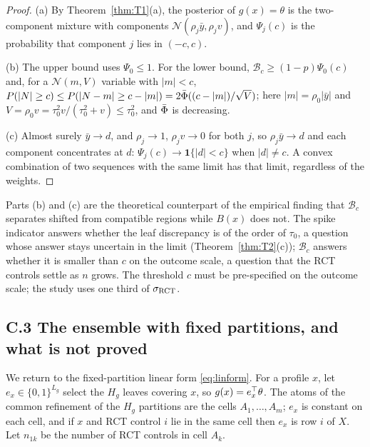 \documentclass[11pt]{article}
\newcommand{\Normal}{\mathcal{N}}
\theoremstyle{definition}
\theoremstyle{plain}
\begin{document}
{\begin{proof}
(a) By Theorem~\ref{thm:T1}(a), the posterior of $g(x)=\theta$ is the two-component mixture with components $\Normal(\rho_j\bar y,\rho_jv)$, and $\Psi_j(c)$ is the probability that component $j$ lies in $(-c,c)$.

(b) The upper bound uses $\Psi_0\le1$. For the lower bound, $\mathcal B_c\ge(1-p)\Psi_0(c)$ and, for a $\Normal(m,V)$ variable with $|m|<c$, $P(|N|\ge c)\le P(|N-m|\ge c-|m|)=2\bar\Phi((c-|m|)/\sqrt V)$; here $|m|=\rho_0|\bar y|$ and $V=\rho_0v=\tau_0^2v/(\tau_0^2+v)\le\tau_0^2$, and $\bar\Phi$ is decreasing.

(c) Almost surely $\bar y\to d$, and $\rho_j\to1$, $\rho_jv\to0$ for both $j$, so $\rho_j\bar y\to d$ and each component concentrates at $d$: $\Psi_j(c)\to\mathbf 1\{|d|<c\}$ when $|d|\ne c$. A convex combination of two sequences with the same limit has that limit, regardless of the weights.
\end{proof}

\begin{remA}\label{rem:whygmap}
Parts (b) and (c) are the theoretical counterpart of the empirical finding that $\mathcal B_c$ separates shifted from compatible regions while $B(x)$ does not. The spike indicator answers whether the leaf discrepancy is of the order of $\tau_0$, a question whose answer stays uncertain in the limit (Theorem~\ref{thm:T2}(c)); $\mathcal B_c$ answers whether it is smaller than $c$ on the outcome scale, a question that the RCT controls settle as $n$ grows. The threshold $c$ must be pre-specified on the outcome scale; the study uses one third of $\sigma_{\rm RCT}$.
\end{remA}

\subsection*{C.3 The ensemble with fixed partitions, and what is not proved}

We return to the fixed-partition linear form \eqref{eq:linform}. For a profile $x$, let $e_x\in\{0,1\}^{L_g}$ select the $H_g$ leaves covering $x$, so $g(x)=e_x^{\top}\theta$. The atoms of the common refinement of the $H_g$ partitions are the cells $A_1,\dots,A_m$; $e_x$ is constant on each cell, and if $x$ and RCT control $i$ lie in the same cell then $e_x$ is row $i$ of $X$. Let $n_{1k}$ be the number of RCT controls in cell $A_k$.

}
\end{document}
